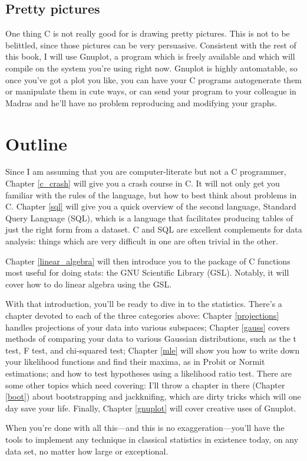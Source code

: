 \documentclass[12pt,notitlepage, openany]{book}
\begin{document}
\subsection{Pretty pictures} One thing C is not really good for is drawing
pretty pictures. This is not to be belittled, since those pictures
can be very persuasive. Consistent with the rest of this book, I will use
Gnuplot, a program which is freely available and which will compile on
the system you're using right now. Gnuplot is highly automatable, so once
you've got a plot you like, you can have your C programs autogenerate
them or manipulate them in cute ways, or can send your program to your
colleague in Madras and he'll have no problem reproducing and modifying
your graphs.




\section{Outline} Since I am assuming that you are computer-literate but
not a C programmer, Chapter \ref{c_crash} will give you a crash course
in C. It will not only get you familiar with the rules of the language,
but how to best think about problems in C. 
Chapter \ref{sql} will give you a quick overview of the second language,
Standard Query Language (SQL), which is a language that facilitates
producing tables of just the right form from a dataset. C and SQL are
excellent complements for data analysis: things which are very difficult
in one are often trivial in the other.

Chapter \ref{linear_algebra}
will then introduce you to the package of C functions most useful for
doing stats: the GNU Scientific Library (GSL). Notably, it will cover
how to do linear algebra using the GSL.

With that introduction, you'll be ready to dive in to the
statistics. There's a chapter devoted to each of the three categories
above: Chapter \ref{projections} handles projections of your data into
various subspaces; Chapter \ref{gauss} covers methods of comparing your
data to various Gaussian distributions, such as the t test, F test,
and chi-squared test; Chapter \ref{mle} will show you how to write
down your likelihood functions and find their maxima, as in Probit
or Normit estimations; and how to test hypotheses using a likelihood
ratio test. There are some other topics which need covering: I'll
throw a chapter in there (Chapter \ref{boot}) about bootstrapping and
jackknifing, which are dirty tricks which will one day save your life.
Finally, Chapter \ref{gnuplot} will cover creative uses of Gnuplot.

When you're done with all this---and this is no exaggeration---you'll
have the tools to implement any technique in classical statistics in
existence today, on any data set, no matter how large or exceptional.











\printindex


\end{document}
